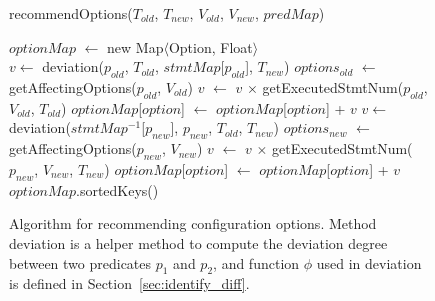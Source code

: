 \begin{figure}[t]
recommendOptions($\mathit{T_{old}}$, $\mathit{T_{new}}$, $\mathit{V_{old}}$, $\mathit{V_{new}}$, $\mathit{predMap}$)\\
\vspace{-4mm}%
\begin{algorithmic}[1]
\STATE $\mathit{optionMap}$ $\leftarrow$ new Map$\langle$Option, Float$\rangle$\\
\STATE $\mathit{v} \leftarrow$ deviation($\mathit{p_{old}}$, $\mathit{T_{old}}$, $\mathit{stmtMap}$[$\mathit{p_{old}}$], $\mathit{T_{new}}$)
\STATE $\mathit{options_{old}}$ $\leftarrow$ getAffectingOptions($\mathit{p_{old}}$, $\mathit{V_{old}}$)
\STATE $\mathit{v}$ $\leftarrow$ $\mathit{v}$ $\times$ getExecutedStmtNum($\mathit{p_{old}}$, $\mathit{V_{old}}$, $\mathit{T_{old}}$)
\STATE $\mathit{optionMap}$[$\mathit{option}$] $\leftarrow$ $\mathit{optionMap}$[$\mathit{option}$] + $\mathit{v}$
\ENDFOR
\ENDFOR
{}
\STATE $\mathit{v} \leftarrow$ deviation($\mathit{stmtMap^{-1}}$[$\mathit{p_{new}}$], $\mathit{p_{new}}$, $\mathit{T_{old}}$, $\mathit{T_{new}}$)
\STATE $\mathit{options_{new}}$ $\leftarrow$ getAffectingOptions($\mathit{p_{new}}$, $\mathit{V_{new}}$)
\STATE $\mathit{v}$ $\leftarrow$ $\mathit{v}$ $\times$ getExecutedStmtNum($\mathit{p_{new}}$, $\mathit{V_{new}}$, $\mathit{T_{new}}$)
\STATE $\mathit{optionMap}$[$\mathit{option}$] $\leftarrow$ $\mathit{optionMap}$[$\mathit{option}$] + $\mathit{v}$
\ENDFOR
\ENDFOR
\RETURN $\mathit{optionMap}$.sortedKeys()
\vspace{-2mm}
\end{algorithmic}
\caption{Algorithm for recommending configuration options.
Method deviation is a helper method to compute the deviation
degree between two predicates $\mathit{p_1}$ and $\mathit{p_2}$, and function $\phi$
used in deviation is defined in Section~\ref{sec:identify_diff}.
\label{fig:recommend}
}


\end{figure}

